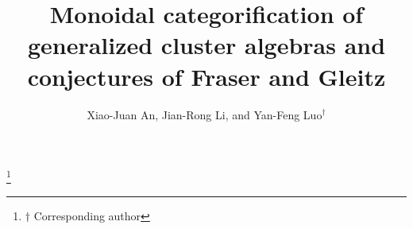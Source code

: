 \documentclass[11pt, reqno]{amsart}
\theoremstyle{plain}
\theoremstyle{definition}
\numberwithin{equation}{section}
\begin{document}
 


\title[Monoidal categorification of generalized cluster algebras]{Monoidal categorification of generalized cluster algebras and conjectures of Fraser and Gleitz}

\author{Xiao-Juan An, Jian-Rong Li, and Yan-Feng Luo$^\dag$}\thanks{$\dag$ Corresponding author}

\address{Xiao-Juan An: School of Mathematics and Statistics, Lanzhou University, Lanzhou 730000, P. R. China; School of Information Engineering and Artificial Intelligence, Lanzhou University of Finance and Economics, Lanzhou 730010, P. R. China.}

\address{Jian-Rong Li: Faculty of Mathematics, University of Vienna, Oskar-Morgenstern Platz 1, 1090 Vienna, Austria.}

\address{Yan-Feng Luo: School of Mathematics and Statistics, Lanzhou University, Lanzhou 730000, P. R. China.}
\date{}
\end{document}
